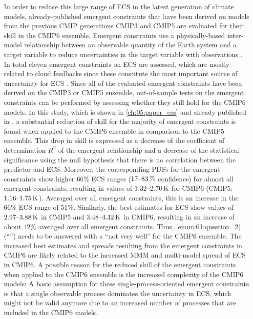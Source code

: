 In order to reduce this large range of \ac{ECS} in the latest generation of
climate  models, already-published emergent constraints that have been derived
on models from the previous \ac{CMIP} generations \acs{CMIP}3 and \acs{CMIP}5
are evaluated for their skill in the \acs{CMIP}6 ensemble. Emergent constraints
use a physically-based inter-model relationship between an observable quantity
of the Earth system and a target variable to reduce uncertainties in the target
variable with observations \autocite{Allen2002}. In total eleven emergent
constraints on \ac{ECS} are assessed, which are mostly related to cloud
feedbacks since these constitute the most important source of uncertainty for
\ac{ECS} \autocite{Boucher2013, Flato2013}. Since all of the evaluated emergent
constraints have been derived on the \acs{CMIP}3 or \acs{CMIP}5 ensemble,
out-of-sample tests on the emergent constraints can be performed by assessing
whether they still hold for the \acs{CMIP}6 models. In this study, which is
shown in \cref{ch:05:paper_ecs} and already published in
\textcite{Schlund2020a}, a substantial reduction of skill for the majority of
emergent constraints is found when applied to the \acs{CMIP}6 ensemble in
comparison to the \acs{CMIP}5 ensemble. This drop in skill is expressed as a
decrease of the coefficient of determination $R^2$ of the emergent relationship
and a decrease of the statistical significance using the null hypothesis that
there is no correlation between the predictor and \ac{ECS}. Moreover, the
corresponding \acp{PDF} for the emergent constraints show higher $66 \unit{\%}$
\ac{ECS} ranges ($\rangeunit{17}{83}{\%}$ confidence) for almost all emergent
constraints, resulting in values of $\rangeunit{1.32}{2.70}{K}$ for \acs{CMIP}6
(\acs{CMIP}5: $\rangeunit{1.16}{1.75}{K}$). Averaged over all emergent
constraints, this is an increase in the $66 \unit{\%}$ \ac{ECS} range of $51
\unit{\%}$. Similarly, the best estimates for \ac{ECS} show values of
$\rangeunit{2.97}{3.88}{K}$ in \acs{CMIP}5 and $\rangeunit{3.48}{4.32}{K}$ in
\acs{CMIP}6, resulting in an increase of about $12 \unit{\%}$ averaged over all
emergent constraints. Thus, \cref{enum:01:question_2}
(\enquote{\emph{\KeyScienceQuestionTwo{}}}) needs to be answered with a
\enquote{not very well} for the \acs{CMIP}6 ensemble. The increased best
estimates and spreads resulting from the emergent constraints in \acs{CMIP}6
are likely related to the increased \ac{MMM} and multi-model spread of \ac{ECS}
in \acs{CMIP}6. A possible reason for the reduced skill of the emergent
constraints when applied to the \acs{CMIP}6 ensemble is the increased
complexity of the \acs{CMIP}6 models: A basic assumption for these
single-process-oriented emergent constraints is that a single observable
process dominates the uncertainty in \ac{ECS}, which might not be valid anymore
due to an increased number of processes that are included in the \acs{CMIP}6
models.

